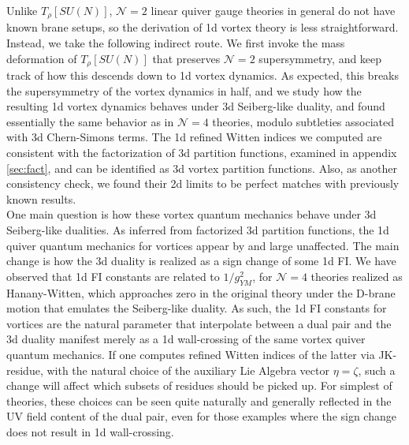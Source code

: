 \documentclass[a4paper,11pt]{article}
\begin{document}
Unlike $T_\rho [SU(N)]$, $\mathcal N = 2$ linear quiver gauge theories in general do not have known brane setups,
so the derivation of 1d vortex theory is less straightforward. Instead, we take the following indirect route.
We first invoke the mass deformation of $T_\rho [SU(N)]$ that preserves $\mathcal N = 2$ supersymmetry, and
keep track of how this descends down to 1d vortex dynamics. As expected, this breaks the supersymmetry
of the vortex dynamics in half, and we study how the resulting 1d vortex dynamics behaves under 3d Seiberg-like
duality, and found essentially the same behavior as in $\mathcal N=4$ theories, modulo subtleties associated with
3d Chern-Simons terms.
The 1d refined Witten indices we computed are consistent with the factorization of 3d partition functions, examined in appendix \ref{sec:fact}, and can be identified as 3d vortex partition functions. Also, as another consistency check, we found their 2d limits to be perfect matches with previously known results.
\\


One main question is how these vortex quantum mechanics behave under 3d Seiberg-like dualities. As inferred from factorized 3d partition functions, the 1d quiver quantum mechanics for vortices appear by and large unaffected. The main change is how the 3d duality is realized as a sign change of some 1d FI. We have observed that 1d FI constants are related to $1/g_{YM}^2$, for $\mathcal N=4$ theories realized as Hanany-Witten, which approaches zero in the original theory under the D-brane motion that emulates the Seiberg-like duality. As such, the 1d FI constants for vortices are the natural parameter that interpolate between a dual pair and the 3d duality manifest merely as a 1d wall-crossing of the same vortex quiver quantum mechanics. If one computes refined Witten indices of the latter via JK-residue, with the
natural choice of the auxiliary Lie Algebra vector $\eta=\zeta$, such a change will affect which subsets of residues should be picked up. For simplest of theories, these choices can be seen quite naturally and generally reflected
in the UV field content of the dual pair, even for those examples where the sign change does not
result in 1d wall-crossing.
\end{document}
